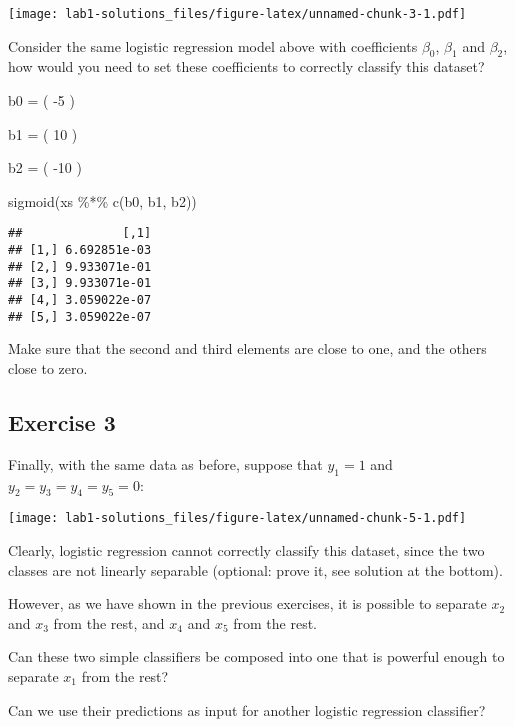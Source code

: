 \documentclass[
]{article}
\newenvironment{Shaded}{\begin{snugshade}}{\end{snugshade}}
\newcommand{\DecValTok}[1]{\textcolor[rgb]{0.00,0.00,0.81}{#1}}
\newcommand{\FunctionTok}[1]{\textcolor[rgb]{0.00,0.00,0.00}{#1}}
\newcommand{\NormalTok}[1]{#1}
\newcommand{\OtherTok}[1]{\textcolor[rgb]{0.56,0.35,0.01}{#1}}
\newcommand{\SpecialCharTok}[1]{\textcolor[rgb]{0.00,0.00,0.00}{#1}}
\begin{document}
\texttt{[image: lab1-solutions\_files/figure-latex/unnamed-chunk-3-1.pdf]}

Consider the same logistic regression model above with coefficients
\(\beta_0\), \(\beta_1\) and \(\beta_2\), how would you need to set
these coefficients to correctly classify this dataset?

\begin{Shaded}
\begin{Highlighting}[]
\NormalTok{b0 }\OtherTok{=}\NormalTok{ (}
  \SpecialCharTok{{-}}\DecValTok{5}
\NormalTok{)}

\NormalTok{b1 }\OtherTok{=}\NormalTok{ (}
  \DecValTok{10}
\NormalTok{)}

\NormalTok{b2 }\OtherTok{=}\NormalTok{ (}
  \SpecialCharTok{{-}}\DecValTok{10}
\NormalTok{)}

\FunctionTok{sigmoid}\NormalTok{(xs }\SpecialCharTok{\%*\%} \FunctionTok{c}\NormalTok{(b0, b1, b2))}
\end{Highlighting}
\end{Shaded}

\begin{verbatim}
##              [,1]
## [1,] 6.692851e-03
## [2,] 9.933071e-01
## [3,] 9.933071e-01
## [4,] 3.059022e-07
## [5,] 3.059022e-07
\end{verbatim}

Make sure that the second and third elements are close to one, and the
others close to zero.

\hypertarget{exercise-3}{%
\subsection{Exercise 3}\label{exercise-3}}

Finally, with the same data as before, suppose that \(y_1=1\) and
\(y_2=y_3=y_4=y_5=0\):

\texttt{[image: lab1-solutions\_files/figure-latex/unnamed-chunk-5-1.pdf]}

Clearly, logistic regression cannot correctly classify this dataset,
since the two classes are not linearly separable (optional: prove it,
see solution at the bottom).

However, as we have shown in the previous exercises, it is possible to
separate \(x_2\) and \(x_3\) from the rest, and \(x_4\) and \(x_5\) from
the rest.

Can these two simple classifiers be composed into one that is powerful
enough to separate \(x_1\) from the rest?

Can we use their predictions as input for another logistic regression
classifier?
\end{document}
